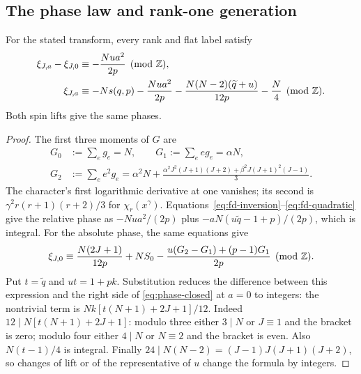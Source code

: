 \subsection{The phase law and rank-one generation}
\begin{theorem}\label{thm:phase-formula}
For the stated transform, every rank and flat label satisfy
\begin{align}
 \xi_{J,a}-\xi_{J,0}&\equiv-\frac{Nu a^2}{2p}\pmod{\mathbb{Z}},
                                      \label{eq:phase-law}\\
 \xi_{J,a}&\equiv-Ns(q,p)-\frac{Nu a^2}{2p}
 -\frac{N(N-2)(\widetilde q+u)}{12p}-\frac N4\pmod{\mathbb{Z}}.
                                      \label{eq:phase-closed}
\end{align}
Both spin lifts give the same phases.
\end{theorem}
\begin{proof}
The first three moments of $G$ are
\begin{align*}
 G_0&:=\sum_e g_e=N,\qquad G_1:=\sum_e eg_e=\alpha N,\\
 G_2&:=\sum_e e^2g_e=\alpha^2N
 +\frac{\alpha^2J^2(J+1)(J+2)+\beta^2J(J+1)^2(J-1)}3.
\end{align*}
The character's first logarithmic derivative at one vanishes; its second
is $\gamma^2r(r+1)(r+2)/3$ for $\chi_r(x^\gamma)$.
Equations~\eqref{eq:fd-inversion}--\eqref{eq:fd-quadratic} give the relative
phase as $-Nu a^2/(2p)$ plus
$-aN(u\widetilde q-1+p)/(2p)$, which is integral.
For the absolute phase, the same equations give
\[
 \xi_{J,0}\equiv\frac{N(2J+1)}{12p}+NS_0
 -\frac{u(G_2-G_1)+(p-1)G_1}{2p}\pmod{\mathbb{Z}}.
\]
Put $t=\widetilde q$ and $ut=1+pk$. Substitution reduces the difference
between this expression and the right side of \eqref{eq:phase-closed}
at $a=0$ to integers: the nontrivial term is
$Nk[t(N+1)+2J+1]/12$.
Indeed $12\mid N[t(N+1)+2J+1]$: modulo three either $3\mid N$ or
$J\equiv1$ and the bracket is zero; modulo four either $4\mid N$ or
$N\equiv2$ and the bracket is even.  Also $N(t-1)/4$ is integral.
Finally $24\mid N(N-2)=(J-1)J(J+1)(J+2)$, so changes of lift or of the
representative of $u$ change the formula by integers.
\end{proof}

